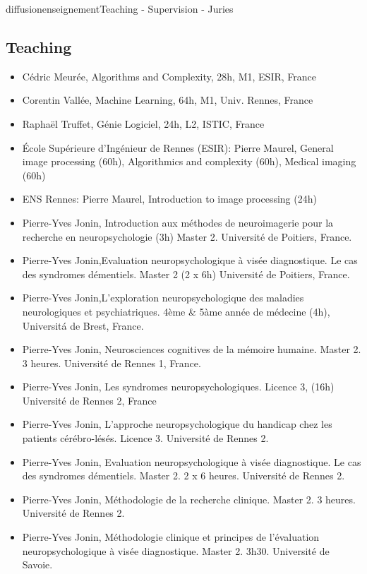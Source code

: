 \documentclass{ra2018}
\begin{document}
\begin{module}{diffusion}{enseignement}{Teaching - Supervision - Juries}

\subsection {Teaching}

\begin{itemize}
     \item Cédric Meurée, Algorithms and Complexity, 28h, M1, ESIR, France
     \item Corentin Vallée, Machine Learning, 64h, M1, Univ. Rennes, France
     \item Raphaël Truffet, Génie Logiciel, 24h, L2, ISTIC, France
     \item École Supérieure d’Ingénieur de Rennes (ESIR): Pierre Maurel, General image processing (60h), Algorithmics and complexity (60h), Medical imaging (60h)
    \item ENS Rennes: Pierre Maurel, Introduction to image processing (24h)
    \item Pierre-Yves Jonin, Introduction aux méthodes de neuroimagerie pour la recherche en neuropsychologie (3h) Master 2. Université de Poitiers, France.
    \item Pierre-Yves Jonin,Evaluation neuropsychologique à visée diagnostique. Le cas des syndromes démentiels. Master 2 (2 x 6h) Université de Poitiers, France.
    \item Pierre-Yves Jonin,L'exploration neuropsychologique des maladies neurologiques et psychiatriques. 4\`eme \& 5\`ame année de m\'edecine (4h), Universit\'a de Brest, France.
    \item Pierre-Yves Jonin, Neurosciences cognitives de la mémoire humaine. Master 2. 3 heures. Université de Rennes 1, France.
    \item Pierre-Yves Jonin, Les syndromes neuropsychologiques. Licence 3, (16h) Université de Rennes 2, France
    \item Pierre-Yves Jonin, L'approche neuropsychologique du handicap chez les patients cérébro-lésés. Licence 3. Université de Rennes 2.
    \item Pierre-Yves Jonin, Evaluation neuropsychologique à visée diagnostique. Le cas des syndromes démentiels. Master 2. 2 x 6 heures. Université de Rennes 2.
    \item Pierre-Yves Jonin, Méthodologie de la recherche clinique. Master 2. 3 heures. Université de Rennes 2.
    \item Pierre-Yves Jonin, Méthodologie clinique et principes de l’évaluation neuropsychologique à visée diagnostique. Master 2. 3h30. Université de Savoie.

\end{itemize}
\end{module}
\end{document}
